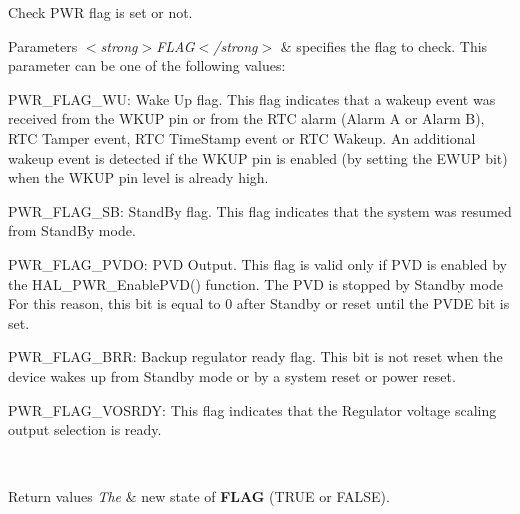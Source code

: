 Check P\+WR flag is set or not. 


\begin{DoxyParams}{Parameters}
{\em $<$strong$>$\+F\+L\+A\+G$<$/strong$>$} & specifies the flag to check. This parameter can be one of the following values\+: \begin{DoxyItemize}
\item P\+W\+R\+\_\+\+F\+L\+A\+G\+\_\+\+WU\+: Wake Up flag. This flag indicates that a wakeup event was received from the W\+K\+UP pin or from the R\+TC alarm (Alarm A or Alarm B), R\+TC Tamper event, R\+TC Time\+Stamp event or R\+TC Wakeup. An additional wakeup event is detected if the W\+K\+UP pin is enabled (by setting the E\+W\+UP bit) when the W\+K\+UP pin level is already high. \item P\+W\+R\+\_\+\+F\+L\+A\+G\+\_\+\+SB\+: Stand\+By flag. This flag indicates that the system was resumed from Stand\+By mode. \item P\+W\+R\+\_\+\+F\+L\+A\+G\+\_\+\+P\+V\+DO\+: P\+VD Output. This flag is valid only if P\+VD is enabled by the H\+A\+L\+\_\+\+P\+W\+R\+\_\+\+Enable\+P\+V\+D() function. The P\+VD is stopped by Standby mode For this reason, this bit is equal to 0 after Standby or reset until the P\+V\+DE bit is set. \item P\+W\+R\+\_\+\+F\+L\+A\+G\+\_\+\+B\+RR\+: Backup regulator ready flag. This bit is not reset when the device wakes up from Standby mode or by a system reset or power reset. \item P\+W\+R\+\_\+\+F\+L\+A\+G\+\_\+\+V\+O\+S\+R\+DY\+: This flag indicates that the Regulator voltage scaling output selection is ready. \end{DoxyItemize}
\\
\hline
\end{DoxyParams}

\begin{DoxyRetVals}{Return values}
{\em The} & new state of {\bfseries F\+L\+AG} (T\+R\+UE or F\+A\+L\+SE). \\
\hline
\end{DoxyRetVals}
\mbox{\label{group___p_w_r___exported___macro_gac0fb2218bc050f5d8fdb1a3f28590352}} 
